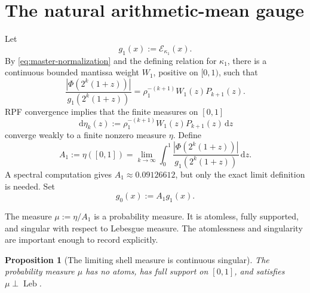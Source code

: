 \documentclass[11pt]{article}
\newtheorem{proposition}[theorem]{Proposition}
\theoremstyle{definition}
\theoremstyle{remark}
\newcommand{\dd}{\,\mathrm d}
\newcommand{\Leb}{\operatorname{Leb}}
\newcommand{\Ecal}{\mathcal E}
\begin{document}
\section{The natural arithmetic-mean gauge}
\label{sec:natural-gauge}

Let
\begin{equation}
 g_1(x):=\Ecal_{\kappa_1}(x).
 \label{eq:g1}
\end{equation}
By \eqref{eq:master-normalization} and the defining relation for \(\kappa_1\),
there is a continuous bounded mantissa weight \(W_1\), positive on \([0,1)\),
such that
\begin{equation}
 \frac{|\Phi(2^k(1+z))|}{g_1(2^k(1+z))}
 =\rho_1^{-(k+1)}W_1(z)P_{k+1}(z).
 \label{eq:natural-shell-density}
\end{equation}
RPF convergence implies that the finite measures on \([0,1]\)
\begin{equation}
 \dd\eta_k(z):=
 \rho_1^{-(k+1)}W_1(z)P_{k+1}(z)\dd z
 \label{eq:etak}
\end{equation}
converge weakly to a finite nonzero measure \(\eta\).  Define
\begin{equation}
 A_1:=\eta([0,1])
 =\lim_{k\to\infty}\int_0^1\frac{|\Phi(2^k(1+z))|}
 {g_1(2^k(1+z))}\dd z.
 \label{eq:A1}
\end{equation}
A spectral computation gives \(A_1\approx0.09126612\), but only the exact
limit definition is needed.  Set
\begin{equation}
 g_0(x):=A_1g_1(x).
 \label{eq:g0}
\end{equation}

The measure \(\mu:=\eta/A_1\) is a probability measure.  It is atomless,
fully supported, and singular with respect to Lebesgue measure.  The
atomlessness and singularity are important enough to record explicitly.

\begin{proposition}[The limiting shell measure is continuous singular]
\label{prop:singular}
The probability measure \(\mu\) has no atoms, has full support on \([0,1]\),
and satisfies \(\mu\perp\Leb\).
\end{proposition}
\end{document}
